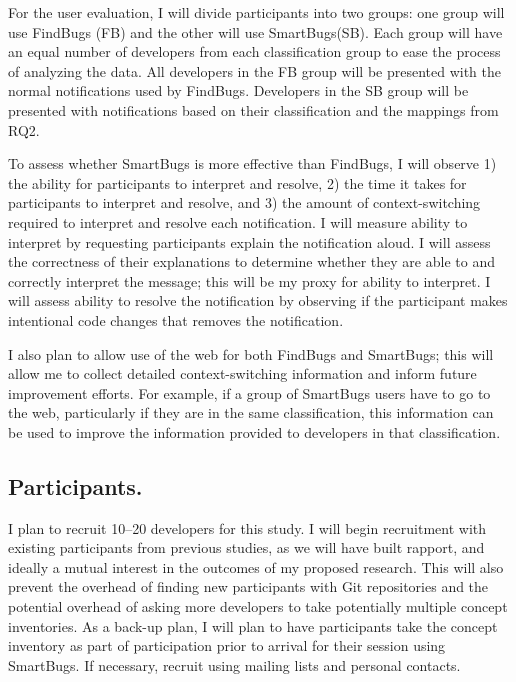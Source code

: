 \documentclass{llncs}
\begin{document}
For the user evaluation, I will divide participants into two groups: one group will use FindBugs (FB) and the other will use SmartBugs(SB). Each group will have an equal number of developers from each classification group to ease the process of analyzing the data. All developers in the FB group will be presented with the normal notifications used by FindBugs. Developers in the SB group will be presented with notifications based on their classification and the mappings from RQ2.

To assess whether SmartBugs is more effective than FindBugs, I will observe 1) the ability for participants to interpret and resolve, 2) the time it takes for participants to interpret and resolve, and 3) the amount of context-switching required to interpret and resolve each notification. I will measure ability to interpret by requesting participants explain the notification aloud. I will assess the correctness of their explanations to determine whether they are able to and correctly interpret the message; this will be my proxy for ability to interpret. I will assess ability to resolve the notification by observing if the participant makes intentional code changes that removes the notification.

I also plan to allow use of the web for both FindBugs and SmartBugs; this will allow me to collect detailed context-switching information and inform future improvement efforts. For example, if a group of SmartBugs users have to go to the web, particularly if they are in the same classification, this information can be used to improve the information provided to developers in that classification.	

\subsection{Participants.} 
I plan to recruit 10--20 developers for this study. I will begin recruitment with existing participants from previous studies, as we will have built rapport, and ideally a mutual interest in the outcomes of my proposed research. This will also prevent the overhead of finding new participants with Git repositories and the potential overhead of asking more developers to take potentially multiple concept inventories. 
As a back-up plan, I will plan to have participants take the concept inventory as part of participation prior to arrival for their session using SmartBugs.
If necessary, recruit using mailing lists and personal contacts.
\end{document}
